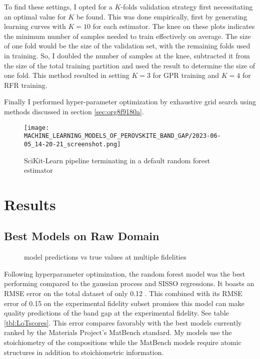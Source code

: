 To find these settings, I opted for a \(K\)-folds validation strategy first necessitating an optimal value for \(K\) be found.
This was done empirically, first by generating learning curves with \(K=10\) for each estimator.
The knee on these plots indicates the minimum number of samples needed to train effectively on average.
The size of one fold would be the size of the validation set, with the remaining folds used in training.
So, I doubled the number of samples at the knee, subtracted it from the size of the total training partition and used the result to determine the size of one fold.
This method resulted in setting \(K = 3\) for GPR training and \(K = 4\) for RFR training.

Finally I performed hyper-parameter optimization by exhaustive grid search using methods discussed in section \ref{sec:org8f9180a}.

\begin{figure}[htbp]
\centering
\texttt{[image: MACHINE\_LEARNING\_MODELS\_OF\_PEROVSKITE\_BAND\_GAP/2023-06-05\_14-20-21\_screenshot.png]}
\caption{\label{fig:pipe} SciKit-Learn pipeline terminating in a default random forest estimator}
\end{figure}

\section{Results}
\label{sec:org7802582}
\subsection{Best Models on Raw Domain}
\label{sec:orgb2d5fd7}
 
\begin{figure}[htbp]
\centering

\caption{\label{fig:pairplots} model predictions vs true values at multiple fidelities}
\end{figure}

Following hyperparameter optimization, the random forest model was the best performing compared to the gaussian process and SISSO regressions.
It boasts an RMSE error on the total dataset of only 0.12 \unit{\electronvolts}.
This combined with its RMSE error of 0.15 \unit{\electronvolts} on the experimental fidelity subset promises this model can make quality predictions of the band gap at the experimental fidelity.
See table \ref{tbl:LoTscores}.
This error compares favorably with the best models currently ranked by the Materials Project's MatBench standard\autocite{dunn-2020-bench-mater}.
My models use the stoichiometry of the compositions while the MatBench models require atomic structures in addition to stoichiometric information.

